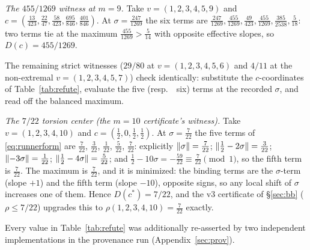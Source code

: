 \emph{The $455/1269$ witness at $m=9$.} Take $v=(1,2,3,4,5,9)$ and
$c=(\tfrac{13}{423},\tfrac{22}{47},\tfrac{58}{423},
\tfrac{695}{846},\tfrac{401}{846})$. At $\sigma=\tfrac{247}{1269}$
the six terms are $\tfrac{247}{1269},\tfrac{455}{1269},
\tfrac{49}{423},\tfrac{455}{1269},\tfrac{385}{2538},
\tfrac{5}{18}$: two terms tie at the maximum
$\tfrac{455}{1269}>\tfrac5{14}$ with opposite effective slopes, so
$D(c)=455/1269$.

The remaining strict witnesses ($29/80$ at $v=(1,2,3,4,5,6)$ and $4/11$
at the non-extremal $v=(1,2,3,4,5,7)$) check identically: substitute the
$c$-coordinates of Table~\ref{tab:refute}, evaluate the five (resp.\ \
six) terms at the recorded $\sigma$, and read off the balanced maximum.

\emph{The $7/22$ torsion center (the $m=10$ certificate's witness).}
Take $v=(1,2,3,4,10)$ and $c=(\tfrac12,0,\tfrac12,\tfrac12)$. At
$\sigma=\tfrac{7}{22}$ the five terms of \eqref{eq:runnerform} are
$\tfrac{7}{22}$, $\tfrac{3}{22}$, $\tfrac{1}{22}$, $\tfrac{5}{22}$,
$\tfrac{7}{22}$: explicitly $\lVert \sigma \rVert=\tfrac7{22}$;
$\lVert \tfrac12-2\sigma \rVert=\tfrac3{22}$;
$\lVert -3\sigma \rVert=\tfrac1{22}$;
$\lVert \tfrac12-4\sigma \rVert=\tfrac5{22}$; and
$\tfrac12-10\sigma=-\tfrac{59}{22}\equiv\tfrac7{22}\pmod 1$, so the
fifth term is $\tfrac7{22}$. The maximum is $\tfrac7{22}$, and it is
minimized: the binding terms are the $\sigma$-term (slope $+1$) and
the fifth term (slope $-10$), opposite signs, so any local shift of
$\sigma$ increases one of them. Hence $D(c^\ast)=7/22$, and the v3
certificate of \S\ref{sec:bb} ($\rho\le7/22$) upgrades this to
$\rho(1,2,3,4,10)=\tfrac{7}{22}$ exactly.

Every value in Table~\ref{tab:refute} was additionally re-asserted by
two independent implementations in the provenance run
(Appendix~\ref{sec:prov}).
